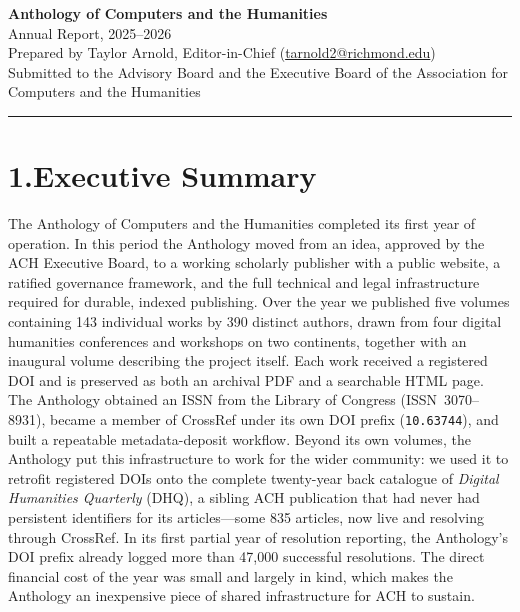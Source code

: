 \documentclass[11pt]{article}
\begin{document}
\fontsize{10}{13}\selectfont

\vspace*{-30pt}

\begin{center}
{\fontsize{13}{16}\selectfont \textbf{Anthology of Computers and the Humanities}} \\[3pt]
{\fontsize{11}{14}\selectfont Annual Report, 2025--2026} \\[3pt]
Prepared by Taylor Arnold, Editor-in-Chief (\href{mailto:tarnold2@richmond.edu}{tarnold2@richmond.edu}) \\
Submitted to the Advisory Board and the Executive Board of the Association for Computers and the Humanities
\end{center}

\vspace{4pt}
\hrule
\vspace{8pt}

\section*{1.\quad Executive Summary}

The Anthology of Computers and the Humanities completed its first year of operation. In this period the Anthology moved from an idea, approved by the ACH Executive Board, to a working scholarly publisher with a public website, a ratified governance framework, and the full technical and legal infrastructure required for durable, indexed publishing. Over the year we published five volumes containing 143 individual works by 390 distinct authors, drawn from four digital humanities conferences and workshops on two continents, together with an inaugural volume describing the project itself. Each work received a registered DOI and is preserved as both an archival PDF and a searchable HTML page. The Anthology obtained an ISSN from the Library of Congress (ISSN~3070--8931), became a member of CrossRef under its own DOI prefix (\texttt{10.63744}), and built a repeatable metadata-deposit workflow. Beyond its own volumes, the Anthology put this infrastructure to work for the wider community: we used it to retrofit registered DOIs onto the complete twenty-year back catalogue of \textit{Digital Humanities Quarterly} (DHQ), a sibling ACH publication that had never had persistent identifiers for its articles---some 835 articles, now live and resolving through CrossRef. In its first partial year of resolution reporting, the Anthology's DOI prefix already logged more than 47{,}000 successful resolutions. The direct financial cost of the year was small and largely in kind, which makes the Anthology an inexpensive piece of shared infrastructure for ACH to sustain.
\end{document}
